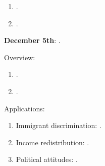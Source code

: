 \documentclass[letterpaper]{article}
\renewenvironment{itemize}{
  \begin{list}{}{
    \setlength{\leftmargin}{1.5em}
  }
}{
  \end{list}
}
\begin{document}
\begin{enumerate}
\begin{itemize}
\begin{enumerate}
              \item[$\bullet$] \href{https://onlinelibrary.wiley.com/doi/abs/10.1111/ajps.12086}{}.

              \item[$\bullet$] \href{https://link.springer.com/10.1057/s41269-020-00174-4}{}.

          \end{enumerate}

      \end{itemize}

  \item {\bf December 5th}:  {\color{ForestGreen}{\bf Natural Experiments}}.


      \begin{itemize} 

        \item[$\diamond$] Overview:

        \begin{enumerate}

          \item[$\bullet$] \href{https://www.cambridge.org/core/product/identifier/9781108777919%23c6/type/book_part}{\fullcite{Titiunik2021}}.

          \item[$\bullet$] \href{https://doi.org/10.1017/S0003055411000542}{}.

        \end{enumerate}

       \item[$\diamond$] Applications:

           \begin{enumerate}

           \item[$\bullet$] Immigrant discrimination: \href{http://www.journals.cambridge.org/abstract_S0003055412000494}{}.

           \item[$\bullet$] Income redistribution: \href{https://doi.org/10.1111/j.1467-9221.2006.00509.x}{}.

           \item[$\bullet$] Political attitudes: \href{https://doi.org/10.1017/S0003055411000141}{}.

         \end{enumerate}

       
      \end{itemize}



\end{enumerate}


\printbibliography
\end{document}
